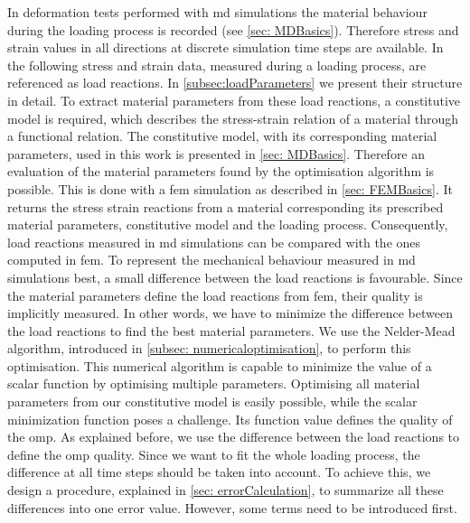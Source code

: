 In deformation tests performed with \acrshort{md} simulations the material behaviour during the loading process is recorded (see \autoref{sec: MDBasics}). Therefore stress and strain values in all directions at discrete simulation time steps are available. In the following stress and strain data, measured during a loading process, are referenced as load reactions. In \autoref{subsec:loadParameters} we present their structure in detail. To extract material parameters from these load reactions, a constitutive model is required, which describes the stress-strain relation of a material through a functional relation. The constitutive model, with its corresponding material parameters, used in this work is presented in \autoref{sec: MDBasics}. Therefore an evaluation of the material parameters found by the optimisation algorithm is possible. This is done with a \acrshort{fem} simulation as described in \autoref{sec: FEMBasics}. It returns the stress strain reactions from a material corresponding its prescribed material parameters, constitutive model and the loading process. Consequently, load reactions measured in \acrshort{md} simulations can be compared with the ones computed in \acrshort{fem}. To represent the mechanical behaviour measured in \acrshort{md} simulations best, a small difference between the load reactions is favourable. Since the material parameters define the load reactions from \acrshort{fem}, their quality is implicitly measured. In other words, we have to minimize the difference between the load reactions to find the best material parameters. We use the Nelder-Mead algorithm, introduced in \autoref{subsec: numericaloptimisation}, to perform this optimisation. This numerical algorithm is capable to minimize the value of a scalar function by optimising multiple parameters. Optimising all material parameters from our constitutive model is easily possible, while the scalar minimization function poses a challenge. Its function value defines the quality of the \acrlong{omp}. As explained before, we use the difference between the load reactions to define the \acrlong{omp} quality. Since we want to fit the whole loading process, the difference at all time steps should be taken into account. To achieve this, we design a procedure, explained in \autoref{sec: errorCalculation}, to summarize all these differences into one error value. However, some terms need to be introduced first. 


